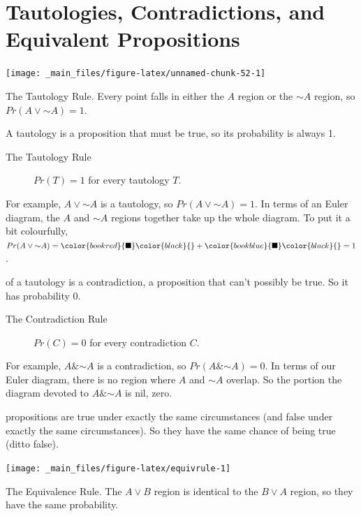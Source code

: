 \documentclass[justified]{tufte-book}
\renewcommand{\neg}{\mathbin{\sim}}
\renewcommand{\wedge}{\mathbin{\&}}
\newcommand{\p}{Pr}
\theoremstyle{definition}
\theoremstyle{definition}
\theoremstyle{definition}
\theoremstyle{definition}
\theoremstyle{remark}
\begin{document}
\hypertarget{tautologies-contradictions-and-equivalent-propositions}{%
\section{Tautologies, Contradictions, and Equivalent Propositions}\label{tautologies-contradictions-and-equivalent-propositions}}

\begin{marginfigure}
\texttt{[image: \_main\_files/figure-latex/unnamed-chunk-52-1]} \caption[The Tautology Rule]{The Tautology Rule. Every point falls in either the $A$ region or the $\neg A$ region, so $\p(A \vee \neg A) = 1$.}\label{fig:unnamed-chunk-52}
\end{marginfigure}

A tautology is a proposition that must be true, so its probability is always 1.

\begin{description}
\item[The Tautology Rule]
\(\p(T) = 1\) for every tautology \(T\).
\end{description}

For example, \(A \vee \neg A\) is a tautology, so \(\p(A \vee \neg A) = 1\). In terms of an Euler diagram, the \(A\) and \(\neg A\) regions together take up the whole diagram. To put it a bit colourfully, \(\p(A \vee \neg A) = \color{bookred}{\blacksquare}\color{black}{} + \color{bookblue}{\blacksquare}\color{black}{} = 1\).

 of a tautology is a contradiction, a proposition that can't possibly be true. So it has probability 0.

\begin{description}
\item[The Contradiction Rule]
\(\p(C) = 0\) for every contradiction \(C\).
\end{description}

For example, \(A \wedge \neg A\) is a contradiction, so \(\p(A \wedge \neg A) = 0\). In terms of our Euler diagram, there is no region where \(A\) and \(\neg A\) overlap. So the portion the diagram devoted to \(A \wedge \neg A\) is nil, zero.

 propositions are true under exactly the same circumstances (and false under exactly the same circumstances). So they have the same chance of being true (ditto false).

\begin{marginfigure}
\texttt{[image: \_main\_files/figure-latex/equivrule-1]} \caption[The Equivalence Rule]{The Equivalence Rule. The $A \vee B$ region is identical to the $B \vee A$ region, so they have the same probability.}\label{fig:equivrule}
\end{marginfigure}
\end{document}
